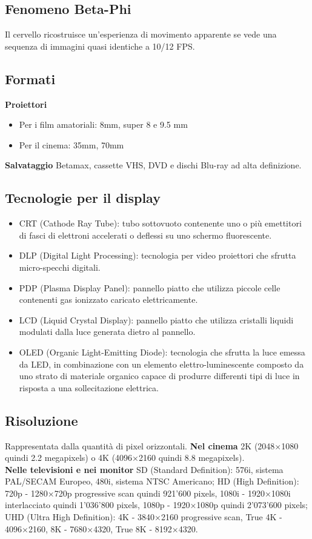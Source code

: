 \documentclass[8pt,a4paper]{article}
\begin{document}
\begin{multicols}{5}
    \subsection{Fenomeno Beta-Phi}
    Il cervello ricostruisce un'esperienza di movimento apparente se vede una 
    sequenza di immagini quasi identiche a 10/12 FPS.
    \subsection{Formati}
      \textbf{Proiettori}
      \begin{itemize}
        \item Per i film amatoriali: 8mm, super 8 e 9.5 mm
        \item Per il cinema: 35mm, 70mm
      \end{itemize}
      \textbf{Salvataggio}
      Betamax, cassette VHS, DVD e dischi Blu-ray ad alta definizione.
    \subsection{Tecnologie per il display}
    \begin{itemize}
      \item CRT (Cathode Ray Tube): tubo sottovuoto contenente uno o più emettitori 
      di fasci di elettroni accelerati o deflessi su uno schermo fluorescente.
      \item DLP (Digital Light Processing): tecnologia per video proiettori che 
      sfrutta micro-specchi digitali.
      \item PDP (Plasma Display Panel): pannello piatto che utilizza piccole celle 
      contenenti gas ionizzato caricato elettricamente.
      \item LCD (Liquid Crystal Display): pannello piatto che utilizza cristalli liquidi 
      modulati dalla luce generata dietro al pannello. 
      \item OLED (Organic Light-Emitting Diode): tecnologia che sfrutta la luce emessa 
      da LED, in combinazione con un elemento elettro-luminescente composto da uno 
      strato di materiale organico capace di produrre differenti tipi di luce in 
      risposta a una sollecitazione elettrica.
    \end{itemize}
    \subsection{Risoluzione}
    Rappresentata dalla quantità di pixel orizzontali. 
      \textbf{Nel cinema} 2K (2048×1080 quindi 2.2 megapixels) o 4K (4096×2160 quindi 
      8.8 megapixels). \\
      \textbf{Nelle televisioni e nei monitor} SD (Standard Definition): 576i, sistema 
      PAL/SECAM Europeo, 480i, sistema NTSC Americano; HD (High Definition): 720p - 
      1280×720p progressive scan quindi 921’600 pixels, 1080i - 1920×1080i interlacciato 
      quindi 1’036’800 pixels, 1080p - 1920×1080p quindi 2’073’600 pixels; UHD (Ultra 
      High Definition): 4K - 3840×2160 progressive scan, True 4K - 4096×2160, 8K - 
      7680×4320, True 8K - 8192×4320.

\end{multicols}
\end{document}
